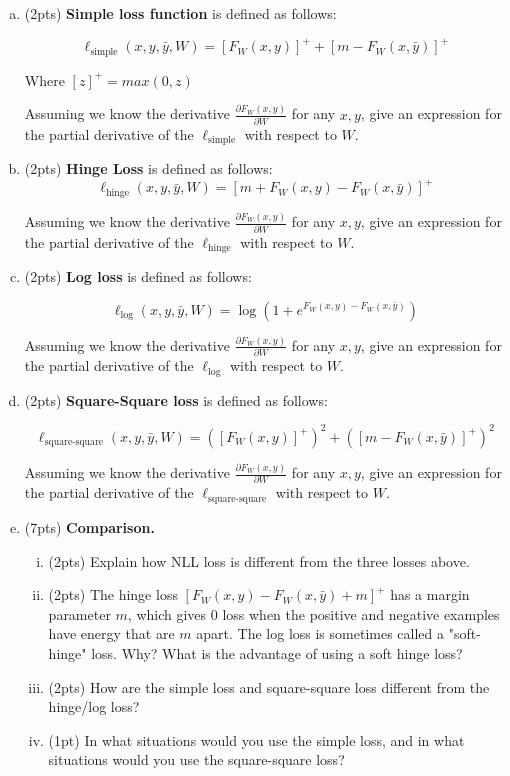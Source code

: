 \documentclass{article}
\newcommand{\pdv}[2]{\frac{\partial #1}{\partial #2}}
\begin{document}
\begin{enumerate}[(a)]
\item (2pts) \textbf{Simple loss function} is defined as follows:

$$
\ell_\text{simple}(x, y, \bar y, W) = \left[ F_W(x, y)\right]^+ + \left[m - F_W(x, \bar y)\right]^+
$$

Where $[z]^+ = max(0, z)$ 

Assuming we know the derivative $\pdv{F_W(x, y)}{W}$ for any $x, y$, give an expression for the partial derivative of the $\ell_\text{simple}$ with respect to $W$.



\item (2pts) \textbf{Hinge Loss} is defined as follows:
$$
\ell_\text{hinge}(x, y, \bar y, W) = \left[m + F_W(x,y) - F_W(x, \bar y)\right]^+
$$

Assuming we know the derivative $\pdv{F_W(x, y)}{W}$ for any $x, y$, give an expression for the partial derivative of the $\ell_\text{hinge}$ with respect to $W$.



\item (2pts) \textbf{Log loss} is defined as follows:

$$
\ell_\text{log}(x, y, \bar y, W) = \log \left(1 +  e^{F_W(x, y) - F_W(x, \bar y)} \right)
$$

Assuming we know the derivative $\pdv{F_W(x, y)}{W}$ for any $x, y$, give an expression for the partial derivative of the $\ell_\text{log}$ with respect to $W$.



\item (2pts) \textbf{Square-Square loss} is defined as follows:

$$
\ell_\text{square-square}(x, y, \bar y, W) = \left(\left[ F_W(x, y)\right]^+ \right)^2 + \left( \left[m - F_W(x, \bar y)\right]^+ \right)^2
$$

Assuming we know the derivative $\pdv{F_W(x, y)}{W}$ for any $x, y$, give an expression for the partial derivative of the $\ell_\text{square-square}$ with respect to $W$.


\item (7pts) \textbf{Comparison.} 
\begin{enumerate}[(i)]
    \item (2pts) Explain how NLL loss is different from the three losses above.
    \item (2pts) The hinge loss $\left[ F_W(x, y) - F_W(x, \bar y) + m \right]^+$ has a margin parameter $m$, which gives 0 loss when the positive and negative examples have energy that are $m$ apart.
    		 The log loss is sometimes called a "soft-hinge" loss. Why? What is the advantage of using a soft hinge loss?
    \item (2pts) How are the simple loss and square-square loss different from the hinge/log loss?
    \item (1pt) In what situations would you use the simple loss, and in what situations would you use the square-square loss?
\end{enumerate}


\end{enumerate}
\end{document}
